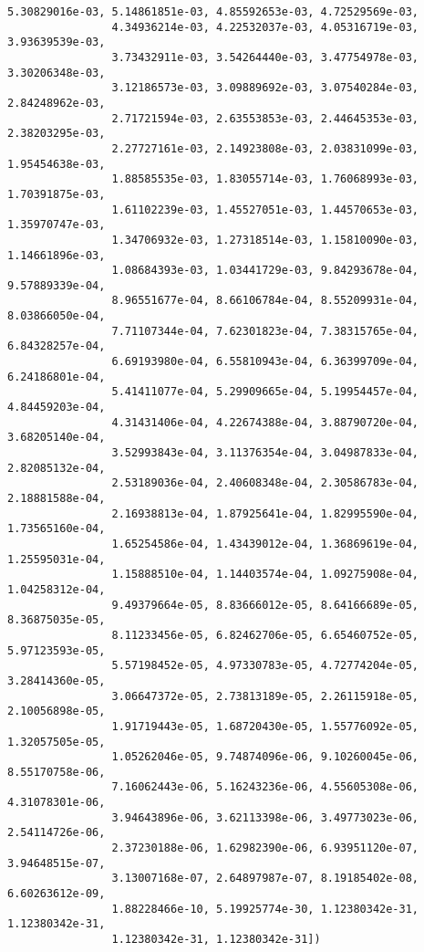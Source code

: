 \documentclass[11pt]{article}
\begin{document}
\begin{Verbatim}[commandchars=\\\{\}]
                5.30829016e-03, 5.14861851e-03, 4.85592653e-03, 4.72529569e-03,
                4.34936214e-03, 4.22532037e-03, 4.05316719e-03, 3.93639539e-03,
                3.73432911e-03, 3.54264440e-03, 3.47754978e-03, 3.30206348e-03,
                3.12186573e-03, 3.09889692e-03, 3.07540284e-03, 2.84248962e-03,
                2.71721594e-03, 2.63553853e-03, 2.44645353e-03, 2.38203295e-03,
                2.27727161e-03, 2.14923808e-03, 2.03831099e-03, 1.95454638e-03,
                1.88585535e-03, 1.83055714e-03, 1.76068993e-03, 1.70391875e-03,
                1.61102239e-03, 1.45527051e-03, 1.44570653e-03, 1.35970747e-03,
                1.34706932e-03, 1.27318514e-03, 1.15810090e-03, 1.14661896e-03,
                1.08684393e-03, 1.03441729e-03, 9.84293678e-04, 9.57889339e-04,
                8.96551677e-04, 8.66106784e-04, 8.55209931e-04, 8.03866050e-04,
                7.71107344e-04, 7.62301823e-04, 7.38315765e-04, 6.84328257e-04,
                6.69193980e-04, 6.55810943e-04, 6.36399709e-04, 6.24186801e-04,
                5.41411077e-04, 5.29909665e-04, 5.19954457e-04, 4.84459203e-04,
                4.31431406e-04, 4.22674388e-04, 3.88790720e-04, 3.68205140e-04,
                3.52993843e-04, 3.11376354e-04, 3.04987833e-04, 2.82085132e-04,
                2.53189036e-04, 2.40608348e-04, 2.30586783e-04, 2.18881588e-04,
                2.16938813e-04, 1.87925641e-04, 1.82995590e-04, 1.73565160e-04,
                1.65254586e-04, 1.43439012e-04, 1.36869619e-04, 1.25595031e-04,
                1.15888510e-04, 1.14403574e-04, 1.09275908e-04, 1.04258312e-04,
                9.49379664e-05, 8.83666012e-05, 8.64166689e-05, 8.36875035e-05,
                8.11233456e-05, 6.82462706e-05, 6.65460752e-05, 5.97123593e-05,
                5.57198452e-05, 4.97330783e-05, 4.72774204e-05, 3.28414360e-05,
                3.06647372e-05, 2.73813189e-05, 2.26115918e-05, 2.10056898e-05,
                1.91719443e-05, 1.68720430e-05, 1.55776092e-05, 1.32057505e-05,
                1.05262046e-05, 9.74874096e-06, 9.10260045e-06, 8.55170758e-06,
                7.16062443e-06, 5.16243236e-06, 4.55605308e-06, 4.31078301e-06,
                3.94643896e-06, 3.62113398e-06, 3.49773023e-06, 2.54114726e-06,
                2.37230188e-06, 1.62982390e-06, 6.93951120e-07, 3.94648515e-07,
                3.13007168e-07, 2.64897987e-07, 8.19185402e-08, 6.60263612e-09,
                1.88228466e-10, 5.19925774e-30, 1.12380342e-31, 1.12380342e-31,
                1.12380342e-31, 1.12380342e-31])
\end{Verbatim}
            
\end{document}
